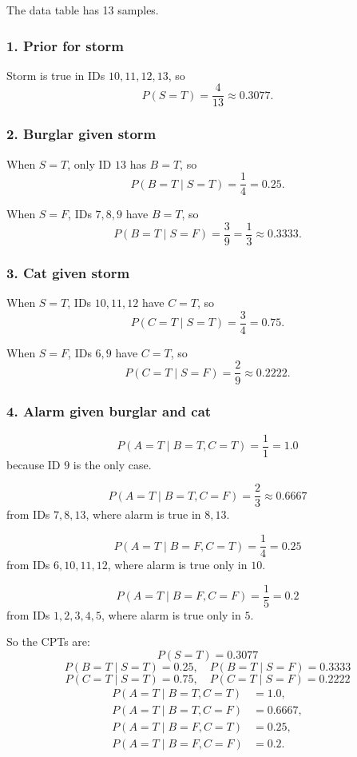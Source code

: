 \documentclass[11pt]{article}
\begin{document}
The data table has 13 samples.

\subsubsection*{1. Prior for storm}

Storm is true in IDs \(10,11,12,13\), so
\[
    P(S=T)=\frac{4}{13}\approx 0.3077.
\]

\subsubsection*{2. Burglar given storm}

When \(S=T\), only ID \(13\) has \(B=T\), so
\[
    P(B=T\mid S=T)=\frac{1}{4}=0.25.
\]

When \(S=F\), IDs \(7,8,9\) have \(B=T\), so
\[
    P(B=T\mid S=F)=\frac{3}{9}=\frac13\approx 0.3333.
\]

\subsubsection*{3. Cat given storm}

When \(S=T\), IDs \(10,11,12\) have \(C=T\), so
\[
    P(C=T\mid S=T)=\frac{3}{4}=0.75.
\]

When \(S=F\), IDs \(6,9\) have \(C=T\), so
\[
    P(C=T\mid S=F)=\frac{2}{9}\approx 0.2222.
\]

\subsubsection*{4. Alarm given burglar and cat}

\[
    P(A=T\mid B=T,C=T)=\frac{1}{1}=1.0
\]
because ID \(9\) is the only case.

\[
    P(A=T\mid B=T,C=F)=\frac{2}{3}\approx 0.6667
\]
from IDs \(7,8,13\), where alarm is true in \(8,13\).

\[
    P(A=T\mid B=F,C=T)=\frac{1}{4}=0.25
\]
from IDs \(6,10,11,12\), where alarm is true only in \(10\).

\[
    P(A=T\mid B=F,C=F)=\frac{1}{5}=0.2
\]
from IDs \(1,2,3,4,5\), where alarm is true only in \(5\).

So the CPTs are:
\[
    \boxed{P(S=T)=0.3077}
\]
\[
    \boxed{
    P(B=T\mid S=T)=0.25,\quad
    P(B=T\mid S=F)=0.3333
    }
\]
\[
    \boxed{
    P(C=T\mid S=T)=0.75,\quad
    P(C=T\mid S=F)=0.2222
    }
\]
\[
    \boxed{
    \begin{aligned}
    P(A=T\mid B=T,C=T)&=1.0,\\
    P(A=T\mid B=T,C=F)&=0.6667,\\
    P(A=T\mid B=F,C=T)&=0.25,\\
    P(A=T\mid B=F,C=F)&=0.2.
    \end{aligned}
    }
\]
\end{document}
